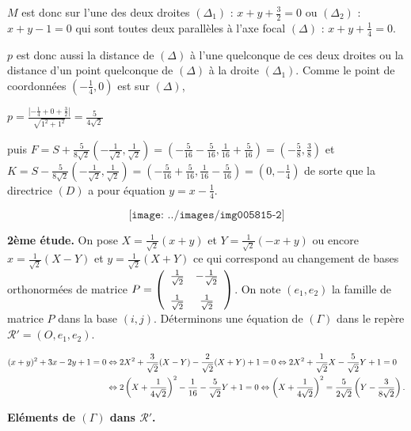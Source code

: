 {\begin{enumerate}
{$M$ est donc sur l'une des deux droites $(\Delta_1)$ : $x+y+\frac{3}{2}=0$ ou $(\Delta_2)$ : $x+y-1=0$ qui sont toutes deux parallèles à l'axe focal $(\Delta)$ : $x+y+\frac{1}{4}=0$.

$p$ est donc aussi la distance de $(\Delta)$ à l'une quelconque de ces deux droites ou la distance d'un point quelconque de $(\Delta)$ à la droite $(\Delta_1)$. Comme le point de coordonnées $\left(-\frac{1}{4},0\right)$ est sur $(\Delta)$,

\begin{center}
$p=\frac{\left|-\frac{1}{4}+0+\frac{3}{2}\right|}{\sqrt{1^2+1^2}}=\frac{5}{4\sqrt{2}}$
\end{center}

puis $F=S+\frac{5}{8\sqrt{2}}\left(-\frac{1}{\sqrt{2}},\frac{1}{\sqrt{2}}\right)=\left(-\frac{5}{16}-\frac{5}{16},\frac{1}{16}+\frac{5}{16}\right)=\left(-\frac{5}{8},\frac{3}{8}\right)$  
et $K =S-\frac{5}{8\sqrt{2}}\left(-\frac{1}{\sqrt{2}},\frac{1}{\sqrt{2}}\right)=\left(-\frac{5}{16}+\frac{5}{16},\frac{1}{16}-\frac{5}{16}\right)=\left(0,-\frac{1}{4}\right)$ de sorte que la directrice $(D)$ a pour équation $y=x-\frac{1}{4}$.

$$\texttt{[image: ../images/img005815-2]}$$



\textbf{2ème étude.} On pose $X =\frac{1}{\sqrt{2}}(x+y)$ et $Y=\frac{1}{\sqrt{2}}(-x+y)$ ou encore $x=\frac{1}{\sqrt{2}}(X-Y)$ et $y=\frac{1}{\sqrt{2}}(X+Y)$ ce qui correspond au changement de bases orthonormées de matrice $P=\left(
\begin{array}{cc}
\frac{1}{\sqrt{2}}&-\frac{1}{\sqrt{2}}\\
\rule{0mm}{6mm}\frac{1}{\sqrt{2}}&\frac{1}{\sqrt{2}}
\end{array}
\right)$. On note $(e_1,e_2)$ la famille de matrice $P$ dans la base $(i,j)$. Déterminons une équation de $(\Gamma)$ dans le repère $\mathcal{R}'=(O,e_1,e_2)$.

\begin{align*}\ensuremath
(x+y)^2+3x-2y+1=0&\Leftrightarrow2X^2+\frac{3}{\sqrt{2}}(X-Y)-\frac{2}{\sqrt{2}}(X+Y)+1 = 0\Leftrightarrow2X^2+\frac{1}{\sqrt{2}}X-\frac{5}{\sqrt{2}}Y+1=0\\
 &\Leftrightarrow2\left(X+\frac{1}{4\sqrt{2}}\right)^2-\frac{1}{16}-\frac{5}{\sqrt{2}}Y+1=0\Leftrightarrow\left(X+\frac{1}{4\sqrt{2}}\right)^2=\frac{5}{2\sqrt{2}}\left(Y-\frac{3}{8\sqrt{2}}\right).
\end{align*}

\textbf{Eléments de $(\Gamma)$ dans $\mathcal{R}'$.}

}
\end{enumerate}}
